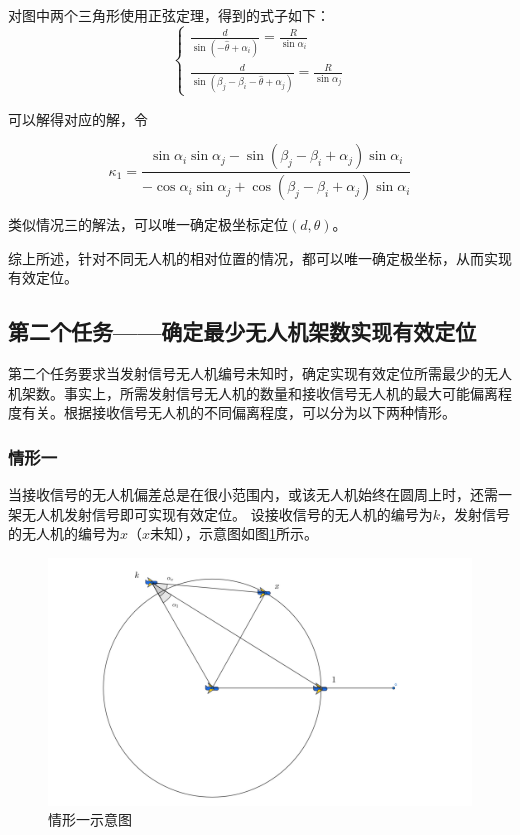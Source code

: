 \documentclass[withoutpreface,bwprint]{cumcmthesis} %
\begin{document}
对图中两个三角形使用正弦定理，得到的式子如下：
\begin{equation}
\left\{\begin{array}{l}
\frac{d}{\sin \left(-\hat{\theta} + \alpha_i\right)}=\frac{R}{\sin \alpha_i} \\
\frac{d}{\sin \left(\beta_j - \beta_i  -\hat{\theta}  + \alpha_j \right)}=\frac{R}{\sin \alpha_j}
\end{array}\right.
\end{equation}

可以解得对应的解，令 

$$\kappa_1 = \frac{\sin \alpha_i \sin \alpha_j - \sin (\beta_j - \beta_i + \alpha_j) \sin \alpha_i}{-\cos \alpha_i \sin \alpha_j + \cos(\beta_j - \beta_i + \alpha_j) \sin \alpha_i}$$

类似情况三的解法，可以唯一确定极坐标定位$(d,\theta)$。

综上所述，针对不同无人机的相对位置的情况，都可以唯一确定极坐标，从而实现有效定位。

\subsection{第二个任务——确定最少无人机架数实现有效定位}

第二个任务要求当发射信号无人机编号未知时，确定实现有效定位所需最少的无人机架数。事实上，所需发射信号无人机的数量和接收信号无人机的最大可能偏离程度有关。根据接收信号无人机的不同偏离程度，可以分为以下两种情形。

\subsubsection{情形一}

当接收信号的无人机偏差总是在很小范围内，或该无人机始终在圆周上时，还需一架无人机发射信号即可实现有效定位。
设接收信号的无人机的编号为$k$，发射信号的无人机的编号为$x$（$x$未知），示意图如图\ref{fig:pos1}所示。

\begin{figure}[H]
    \centering
    \includegraphics[width=1.0\textwidth]{figures/T2 fig0.png}
    \caption{情形一示意图}
    \label{fig:pos1}
\end{figure}
\end{document}
